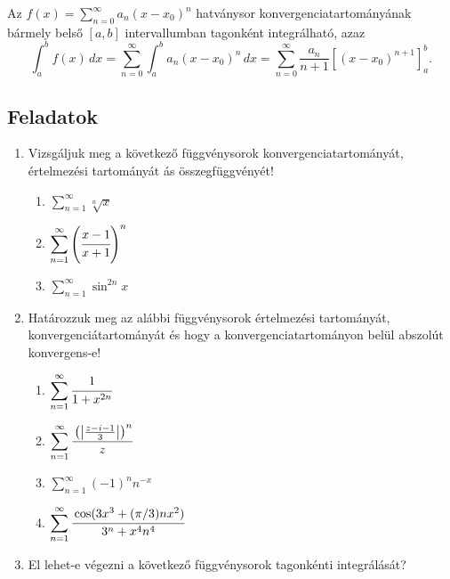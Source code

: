\documentclass[a4paper, 12pt]{scrartcl}
\begin{document}
\begin{theorem}
    Az $f(x) = \displaystyle \sum_{n=0}^{\infty}a_n(x-x_0)^n$ hatványsor kon\-ver\-gen\-ci\-a\-tar\-to\-má\-nyá\-nak bármely belső $[a,b]$ intervallumban tagonként integrálható, azaz
    \[
\int_a^b f(x) \, dx = \sum_{n=0}^\infty \int_a^b a_n (x - x_0)^n \, dx 
= \sum_{n=0}^\infty \frac{a_n}{n+1} \left[(x - x_0)^{n+1}\right]_a^b.
\]
    
\end{theorem}
\clearpage
\subsection{Feladatok}
\begin{enumerate}
    \item Vizsgáljuk meg a következő függvénysorok konvergenciatartományát, értelmezési tartományát ás összegfüggvényét!
    \begin{multicols}{3}
        \begin{enumerate}
            \item $\displaystyle \sum_{n=1}^{\infty} \sqrt[n]{x}$
            \item $\displaystyle \sum_{n=1}^{\infty} \left(\cfrac{x-1}{x+1}\right)^n$
            \item $\displaystyle \sum_{n=1}^{\infty} \sin^{2n}x$
        \end{enumerate}
    \end{multicols}
    \item Határozzuk meg az alábbi függvénysorok értelmezési tartományát, konvergenciátartományát és hogy a konvergenciatartományon belül abszolút konvergens-e!
    \begin{multicols}{2}
        \begin{enumerate}
            \item $\displaystyle \sum_{n=1}^{\infty} \cfrac{1}{1+x^{2n}}$
            \item $\displaystyle \sum_{n=1}^{\infty} \cfrac{\left(\left|\frac{z-i-1}{3}\right|\right)^n}{z}$
            \item $\displaystyle \sum_{n=1}^{\infty} (-1)^n n^{-x}$
            \item $\displaystyle \sum_{n=1}^{\infty} \cfrac{\cos (3x^3 +(\pi/3)nx^2)}{3^n +x^4n^4}$
        \end{enumerate}
    \end{multicols}
    \item El lehet-e végezni a következő függvénysorok tagonkénti integrálását?

\end{enumerate}
\end{document}
